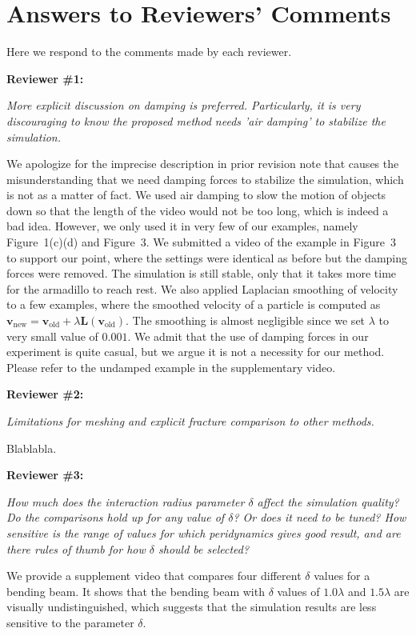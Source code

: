 \section{Answers to Reviewers' Comments}

Here we respond to the comments made by each reviewer.

\noindent{}\textbf{Reviewer \#1:}

\emph{More explicit discussion on damping is preferred. Particularly, it is very discouraging to know the proposed method needs 'air damping' to stabilize the simulation.}

We apologize for the imprecise description in prior revision note that causes the misunderstanding that we need damping forces to stabilize the simulation, which is not as a matter of fact. We used air damping to slow the motion of objects down so that the length of the video would not be too long, which is indeed a bad idea. However, we only used it in very few of our examples, namely Figure~1(c)(d) and Figure~3. We submitted a video of the example in Figure~3 to support our point, where the settings were identical as before but the damping forces were removed. The simulation is still stable, only that it takes more time for the armadillo to reach rest. We also applied Laplacian smoothing of velocity to a few examples, where the smoothed velocity of a particle is computed as $\mathbf{v}_{\mathrm{new}}=\mathbf{v}_{\mathrm{old}}+\lambda \mathbf{L}(\mathbf{v}_{\mathrm{old}})$. The smoothing is almost negligible since we set $\lambda$ to very small value of $0.001$. We admit that the use of damping forces in our experiment is quite casual, but we argue it is not a necessity for our method. Please refer to the undamped example in the supplementary video.

\noindent{}\textbf{Reviewer \#2:}

\emph{Limitations for meshing and explicit fracture comparison to other methods.}

Blablabla.

\noindent{}\textbf{Reviewer \#3:}

\emph{How much does the interaction radius parameter $\delta$ affect the simulation quality? Do the comparisons hold up for any value of $\delta$? Or does it need to be tuned? How sensitive is the range of values for which peridynamics gives good result, and are there rules of thumb for how $\delta$ should be selected?}

We provide a supplement video that compares four different $\delta$ values for a bending beam. It shows that the bending beam with $\delta$ values of $1.0\lambda$ and $1.5\lambda$ are visually undistinguished, which suggests that the simulation results are less sensitive to the parameter $\delta$.

